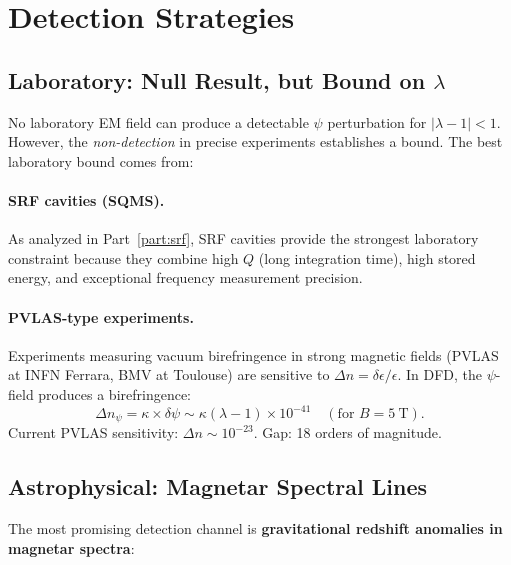 \documentclass[11pt]{article}
\newcommand{\lam}{\lambda}
\newcommand{\lbone}{|\lambda - 1|}
\newcommand{\dpsi}{\delta\psi}
\begin{document}
\section{Detection Strategies}
\label{sec:strong-em-detection}

\subsection{Laboratory: Null Result, but Bound on $\lambda$}

No laboratory EM field can produce a detectable $\psi$ perturbation
for $\lbone < 1$.  However, the \textit{non-detection} in precise
experiments establishes a bound.  The best laboratory bound comes
from:

\paragraph{SRF cavities (SQMS).}
As analyzed in Part~\ref{part:srf}, SRF cavities provide the
strongest laboratory constraint because they combine high $Q$
(long integration time), high stored energy, and exceptional
frequency measurement precision.

\paragraph{PVLAS-type experiments.}
Experiments measuring vacuum birefringence in strong magnetic fields
(PVLAS at INFN Ferrara, BMV at Toulouse) are sensitive to
$\Delta n = \delta\epsilon/\epsilon$.  In DFD, the $\psi$-field
produces a birefringence:
\begin{equation}
\Delta n_\psi = \kappa \times \dpsi \sim \kappa(\lam-1)
\times 10^{-41}\quad (\text{for } B = 5~\text{T}).
\end{equation}
Current PVLAS sensitivity: $\Delta n \sim 10^{-23}$.  Gap: 18
orders of magnitude.

\subsection{Astrophysical: Magnetar Spectral Lines}

The most promising detection channel is \textbf{gravitational
redshift anomalies in magnetar spectra}:
\end{document}
